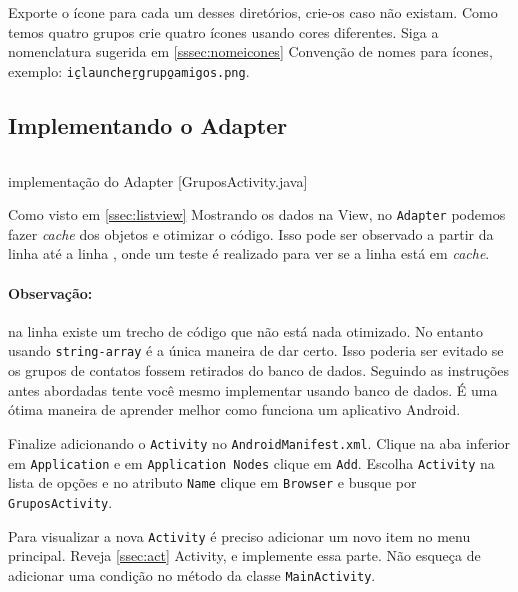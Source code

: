 Exporte o ícone para cada um desses diretórios, crie-os caso não existam. Como temos quatro
grupos crie quatro ícones usando cores diferentes. Siga a nomenclatura sugerida em \ref{sssec:nomeicones}
Convenção de nomes para ícones, exemplo: \texttt{ic\b{ }launcher\b{ }grupo\b{ }amigos.png}.

\subsection{Implementando o Adapter}

\begin{listing}[H]
  \inputminted[linenos=true,frame=bottomline,tabsize=3]{ java }{ source/GruposActivity-3.java }
  \caption{implementação do Adapter [GruposActivity.java]}
\end{listing}

Como visto em \ref{ssec:listview} Mostrando os dados na View, no \texttt{Adapter} podemos fazer
\textit{cache} dos objetos e otimizar o código. Isso pode ser observado a partir da linha 
até a linha , onde um teste é realizado para ver se a linha está em \textit{cache}.

\paragraph{Observação:} na linha  existe um trecho de código que não está nada otimizado.
No entanto usando \texttt{string-array} é a única maneira de dar certo. Isso poderia ser evitado se
os grupos de contatos fossem retirados do banco de dados. Seguindo as instruções antes abordadas tente
você mesmo implementar usando banco de dados. É uma ótima maneira de aprender melhor como funciona
um aplicativo Android.

\medskip

Finalize adicionando o \texttt{Activity} no \texttt{AndroidManifest.xml}. Clique na aba inferior em
\texttt{Application} e em \texttt{Application Nodes} clique em \texttt{Add}. Escolha \texttt{Activity}
na lista de opções e no atributo \texttt{Name} clique em \texttt{Browser} e busque por
\texttt{GruposActivity}.

Para visualizar a nova \texttt{Activity} é preciso adicionar um novo item no menu principal. Reveja
\ref{ssec:act} Activity, e implemente essa parte. Não esqueça de adicionar uma condição no método
 da classe \texttt{MainActivity}.


